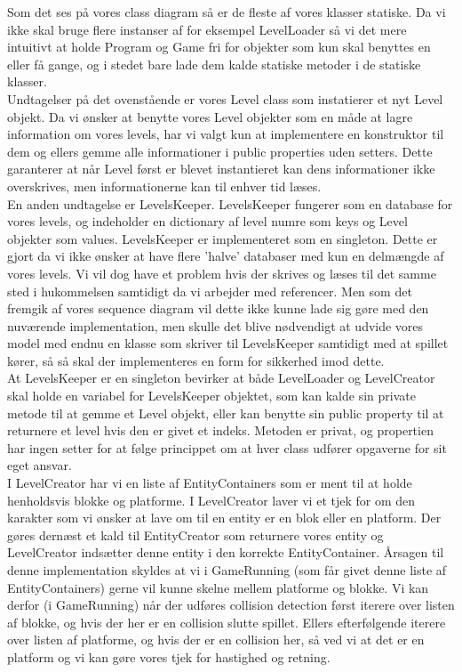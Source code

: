 Som det ses på vores class diagram så er de fleste af vores klasser statiske. Da vi ikke skal bruge flere instanser af for eksempel LevelLoader så vi det mere intuitivt at holde Program og Game fri for objekter som kun skal benyttes en eller få gange, og i stedet bare lade dem kalde statiske metoder i de statiske klasser.\\
Undtagelser på det ovenstående er vores Level class som instatierer et nyt Level objekt. Da vi ønsker at benytte vores Level objekter som en måde at lagre information om vores levels, har vi valgt kun at implementere en konstruktor til dem og ellers gemme alle informationer i public properties uden setters. Dette garanterer at når Level først er blevet instantieret kan dens informationer ikke overskrives, men informationerne kan til enhver tid læses.\\
En anden undtagelse er LevelsKeeper. LevelsKeeper fungerer som en database for vores levels, og indeholder en dictionary af level numre som keys og Level objekter som values. LevelsKeeper er implementeret som en singleton. Dette er gjort da vi ikke ønsker at have flere 'halve' databaser med kun en delmængde af vores levels. Vi vil dog have et problem hvis der skrives og læses til det samme sted i hukommelsen samtidigt da vi arbejder med referencer. Men som det fremgik af vores sequence diagram vil dette ikke kunne lade sig gøre med den nuværende implementation, men skulle det blive nødvendigt at udvide vores model med endnu en klasse som skriver til LevelsKeeper samtidigt med at spillet kører, så så skal der implementeres en form for sikkerhed imod dette.\\
At LevelsKeeper er en singleton bevirker at både LevelLoader og LevelCreator skal holde en variabel for LevelsKeeper objektet, som kan kalde sin private metode til at gemme et Level objekt, eller kan benytte sin public property til at returnere et level hvis den er givet et indeks. Metoden er privat, og propertien har ingen setter for at følge princippet om at hver class udfører opgaverne for sit eget ansvar.\\

I LevelCreator har vi en liste af EntityContainers som er ment til at holde henholdsvis blokke og platforme. I LevelCreator laver vi et tjek for om den karakter som vi ønsker at lave om til en entity er en blok eller en platform. Der gøres dernæst et kald til EntityCreator som returnere vores entity og LevelCreator indsætter denne entity i den korrekte EntityContainer. Årsagen til denne implementation skyldes at vi i GameRunning (som får givet denne liste af EntityContainers) gerne vil kunne skelne mellem platforme og blokke. Vi kan derfor (i GameRunning) når der udføres collision detection først iterere over listen af blokke, og hvis der her er en collision slutte spillet. Ellers efterfølgende iterere over listen af platforme, og hvis der er en collision her, så ved vi at det er en platform og vi kan gøre vores tjek for hastighed og retning.\\

